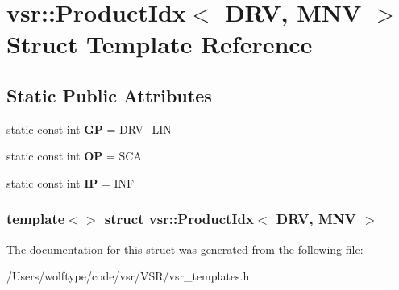 \hypertarget{structvsr_1_1_product_idx_3_01_d_r_v_00_01_m_n_v_01_4}{\section{vsr\-:\-:Product\-Idx$<$ D\-R\-V, M\-N\-V $>$ Struct Template Reference}
\label{structvsr_1_1_product_idx_3_01_d_r_v_00_01_m_n_v_01_4}
}
\subsection*{Static Public Attributes}
\begin{DoxyCompactItemize}
\item 
\hypertarget{structvsr_1_1_product_idx_3_01_d_r_v_00_01_m_n_v_01_4_ab46ecd2a427d09d3eb6e644b5721c493}{static const int {\bfseries G\-P} = D\-R\-V\-\_\-\-L\-I\-N}\label{structvsr_1_1_product_idx_3_01_d_r_v_00_01_m_n_v_01_4_ab46ecd2a427d09d3eb6e644b5721c493}

\item 
\hypertarget{structvsr_1_1_product_idx_3_01_d_r_v_00_01_m_n_v_01_4_af7cc58c4497d1a86bce0952e74912221}{static const int {\bfseries O\-P} = S\-C\-A}\label{structvsr_1_1_product_idx_3_01_d_r_v_00_01_m_n_v_01_4_af7cc58c4497d1a86bce0952e74912221}

\item 
\hypertarget{structvsr_1_1_product_idx_3_01_d_r_v_00_01_m_n_v_01_4_ad81cd4bd27047e498390fea681ff38a3}{static const int {\bfseries I\-P} = I\-N\-F}\label{structvsr_1_1_product_idx_3_01_d_r_v_00_01_m_n_v_01_4_ad81cd4bd27047e498390fea681ff38a3}

\end{DoxyCompactItemize}
\subsubsection*{template$<$$>$ struct vsr\-::\-Product\-Idx$<$ D\-R\-V, M\-N\-V $>$}



The documentation for this struct was generated from the following file\-:\begin{DoxyCompactItemize}
\item 
/\-Users/wolftype/code/vsr/\-V\-S\-R/vsr\-\_\-templates.\-h\end{DoxyCompactItemize}
